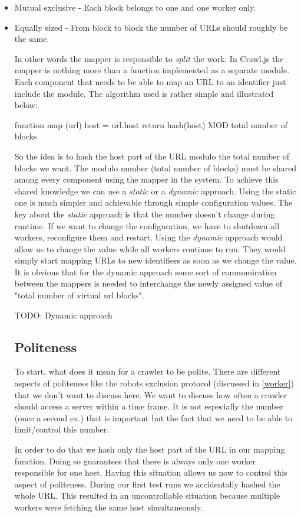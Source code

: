 \begin{itemize}
  \item Mutual exclusive - Each block belongs to one and one worker only.
  \item Equally sized - From block to block the number of URLs should roughly be the same.

In other words the mapper is responsible to \emph{split} the work. In Crawl.js the mapper is nothing more than a function implemented as a separate module. Each component that needs to be able to map an URL to an identifier just include the module. The algorithm used is rather simple and illustrated below:

function map (url)
  host = url.host
  return hash(host) MOD total number of blocks

So the idea is to hash the host part of the URL modulo the total number of blocks we want. The modulo number (total number of blocks) must be shared among every component using the mapper in the system.
To achieve this shared knowledge we can use a \emph{static} or a \emph{dynamic} approach. Using the static one is much simpler and achievable through simple configuration values. The key about the \emph{static} approach is that the number doesn't change during runtime. If we want to change the configuration, we have to shutdown all workers, reconfigure them and restart. Using the \emph{dynamic} approach would allow us to change the value while all workers continue to run. They would simply start mapping URLs to new identifiers as soon as we change the value. It is obvious that for the dynamic approach some sort of communication between the mappers is needed to interchange the newly assigned value of "total number of virtual url blocks".

TODO: Dynamic approach

\subsection{Politeness}
To start, what does it mean for a crawler to be polite. There are different aspects of politeness like the robots exclusion protocol (discussed in \ref{worker}) that we don't want to discuss here. We want to discuss how often a crawler should access a server within a time frame. It is not especially the number (once a second ex.) that is important but the fact that we need to be able to limit/control this number.

In order to do that we hash only the host part of the URL in our mapping function. Doing so guarantees that there is always only one worker responsible for one host. Having this situation allows us now to control this aspect of politeness.
During our first test runs we accidentally hashed the whole URL. This resulted in an uncontrollable situation because multiple workers were fetching the same host simultaneously.


\end{itemize}
